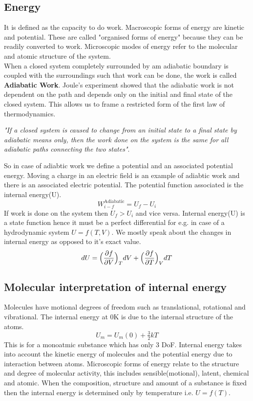 \documentclass[12pt]{article}
\begin{document}
\subsection{Energy}
It is defined as the capacity to do work. Macroscopic forms of energy are kinetic and potential. These are called "organised forms of energy" because they can be readily converted to work. Microscopic modes of energy refer to the molecular and atomic structure of the system. \\

When a closed system completely surrounded by am adiabatic boundary is coupled with the surroundings such that work can be done, the work is called \textbf{Adiabatic Work}. Joule's experiment showed that the adiabatic work is not dependent on the path and depends only on the initial and final state of the closed system. This allows us to frame a restricted form of the first law of thermodynamics. 
\begin{center}
	\textit{"If a closed system is caused to change from an initial state to a final state by adiabatic means only, then the work done on the system is the same for all adiabatic paths connecting the two states"}.
\end{center}

So in case of adiabtic work we define a potential and an associated potential energy. Moving a charge in an electric field is an example of adiabtic work and there is an associated electric potential. The potential function associated is the internal energy(U). 
\begin{equation}
	W_{i-f}^{\text{Adiabatic}}=U_f-U_i
\end{equation}
If work is done on the system then $U_f>U_i$ and vice versa. Internal energy(U) is a state function hence it must be a perfect differential for e.g. in case of a hydrodynamic system $U=f(T,V)$. We mostly speak about the changes in internal energy as opposed to it's exact value. 
\begin{equation}
	dU=\Big(\pdv{f}{V}\Big)_TdV+\Big(\pdv{f}{T}\Big)_VdT
\end{equation}

\subsection{Molecular interpretation of internal energy}
Molecules have motional degrees of freedom such as translational, rotational and vibrational. The internal energy at 0K is due to the internal structure of the atoms. 
\begin{equation*}
U_m=U_m(0)+\tfrac{3}{2}kT
\end{equation*}
This is for a monoatmic substance which has only 3 DoF. Internal energy takes into account the kinetic energy of molecules and the potential energy due to interaction between atoms. Microscopic forms of energy relate to the structure and degree of molecular activity, this includes sensible(motional), latent, chemical and atomic. When the composition, structure and amount of a substance is fixed then the internal energy is determined only by temperature i.e. $U=f(T)$. \\
\end{document}
